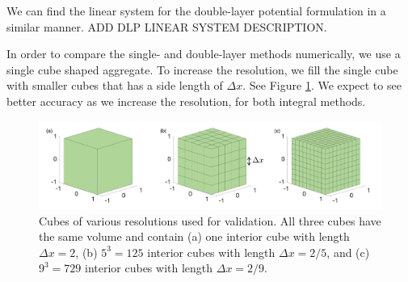  We can find the linear system for the double-layer potential formulation in a similar manner. 
 {\color{blue} ADD DLP LINEAR SYSTEM DESCRIPTION.}
 \par
In order to compare the single- and double-layer methods numerically, we use a single cube shaped aggregate. To increase the resolution, we fill the single cube with smaller cubes that has a side length of $\Delta x$. See Figure \ref{fig_cube_all}. We expect to see better accuracy as we increase the resolution, for both integral methods. 
\begin{figure}[ht]
	\begin{center}
		\vspace{0.5cm}
		\includegraphics[scale=0.45]{./figures/fig_cube_all_dx}
	\caption{Cubes of various resolutions used for validation. All three cubes have the same volume and contain (a) one interior cube with length $\Delta x = 2$, (b) $5^3 = 125$ interior cubes with length $\Delta x = 2/5$, and (c) $9^3 = 729$ interior cubes with length $ \Delta x = 2/9$. }
	\label{fig_cube_all}
\end{center}
\end{figure}

